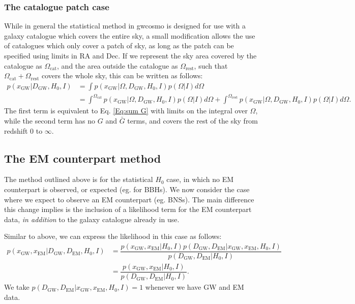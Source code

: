 \documentclass[a4paper,10pt]{article}
\begin{document}
\subsubsection{The catalogue patch case}
While in general the statistical method in gwcosmo is designed for use with a galaxy catalogue which covers the entire sky, a small modification allows the use of catalogues which only cover a patch of sky, as long as the patch can be specified using limits in RA and Dec.  If we represent the sky area covered by the catalogue as $\Omega_{\text{cat}}$, and the area outside the catalogue as $\Omega_{\text{rest}}$, such that $\Omega_{\text{cat}}+\Omega_{\text{rest}}$ covers the whole sky, this can be written as follows:
\begin{equation}
\begin{aligned}
p(x_{\text{GW}}|D_{\text{GW}},H_0,I) &= \int p(x_{\text{GW}}|\Omega,D_{\text{GW}},H_0,I)p(\Omega|I) d\Omega
\\&=  \int^{\Omega_{\text{cat}}} p(x_{\text{GW}}|\Omega,D_{\text{GW}},H_0,I)p(\Omega|I) d\Omega + \int^{\Omega_{\text{rest}}}p(x_{\text{GW}}|\Omega,D_{\text{GW}},H_0,I)p(\Omega|I) d\Omega.
\end{aligned} 
\end{equation}
The first term is equivalent to Eq. \ref{Eq:sum G} with limits on the integral over $\Omega$, while the second term has no $G$ and $\bar{G}$ terms, and covers the rest of the sky from redshift 0 to $\infty$.


\subsection{The EM counterpart method}
The method outlined above is for the statistical $H_0$ case, in which no EM counterpart is observed, or expected (eg. for BBHs).  We now consider the case where we expect to observe an EM counterpart (eg. BNSs).  The main difference this change implies is the inclusion of a likelihood term for the EM counterpart data, \emph{in addition} to the galaxy catalogue already in use.

Similar to above, we can express the likelihood in this case as follows:
\begin{equation}
\begin{aligned}
p(x_{\text{GW}},x_{\text{EM}}|D_{\text{GW}},D_{\text{EM}},H_0,I) &= \dfrac{p(x_{\text{GW}},x_{\text{EM}}|H_0,I) p(D_{\text{GW}},D_{\text{EM}}|x_{\text{GW}},x_{\text{EM}},H_0,I)}{p(D_{\text{GW}},D_{\text{EM}}|H_0,I)}
\\&= \dfrac{p(x_{\text{GW}},x_{\text{EM}}|H_0,I)}{p(D_{\text{GW}},D_{\text{EM}}|H_0,I)}.
\end{aligned} 
\end{equation}
We take $p(D_{\text{GW}},D_{\text{EM}}|x_{\text{GW}},x_{\text{EM}},H_0,I)=1$ whenever we have GW and EM data.
\end{document}
